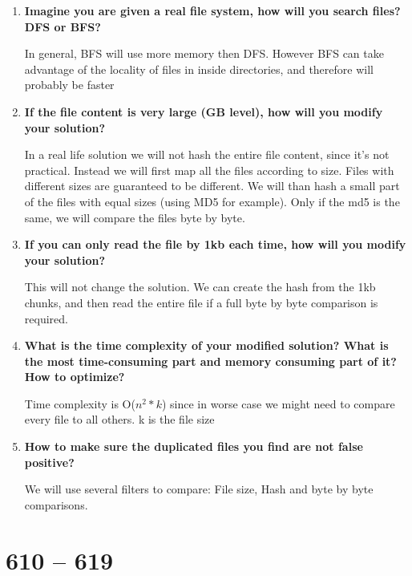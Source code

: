 \documentclass[a4paper,12pt]{article}
\begin{document}
\begin{enumerate}
	\item \textbf{Imagine you are given a real file system, how will you search files? DFS or BFS?}
	\par
	In general, BFS will use more memory then DFS. However BFS can take advantage of the locality of files in inside directories, and therefore will probably be faster
	\item \textbf{If the file content is very large (GB level), how will you modify your solution?}
	\par
	In a real life solution we will not hash the entire file content, since it's not practical. Instead we will first map all the files according to size. Files with different sizes are guaranteed to be different. We will than hash a small part of the files with equal sizes (using MD5 for example). Only if the md5 is the same, we will compare the files byte by byte.
	\item \textbf{If you can only read the file by 1kb each time, how will you modify your solution?}
	\par
	This will not change the solution. We can create the hash from the 1kb chunks, and then read the entire file if a full byte by byte comparison is required.
	\item \textbf{What is the time complexity of your modified solution? What is the most time-consuming part and memory consuming part of it? How to optimize?}
	\par
	Time complexity is O($n^2 * k$) since in worse case we might need to compare every file to all others. k is the file size
	\item\textbf{ How to make sure the duplicated files you find are not false positive?}
	\par
	We will use several filters to compare: File size, Hash and byte by byte comparisons.
\end{enumerate}

\section{610 -- 619}
\end{document}
